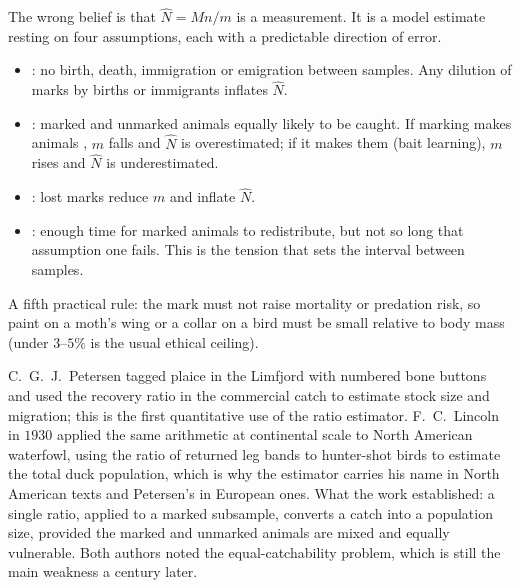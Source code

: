 \begin{warnbox}[title={TRAP: the four assumptions of mark-recapture}]
The wrong belief is that $\hat{N}=Mn/m$ is a measurement. It is a model estimate
resting on four assumptions, each with a predictable direction of error.
\begin{itemize}
\item {}: no birth, death, immigration or emigration between
samples. Any dilution of marks by births or immigrants inflates $\hat{N}$.
\item {}: marked and unmarked animals equally likely to be
caught. If marking makes animals , $m$ falls and $\hat{N}$ is
overestimated; if it makes them  (bait learning), $m$ rises and
$\hat{N}$ is underestimated.
\item {}: lost marks reduce $m$ and inflate
$\hat{N}$.
\item {}: enough time for marked animals to redistribute, but
not so long that assumption one fails. This is the tension that sets the
interval between samples.
\end{itemize}
A fifth practical rule: the mark must not raise mortality or predation risk, so
paint on a moth's wing or a collar on a bird must be small relative to body mass
(under $3$--$5\%$ is the usual ethical ceiling).
\end{warnbox}

\begin{expbox}[title={EXPERIMENT: Petersen's plaice, 1896, and Lincoln's ducks, 1930}]
C.~G.~J.~Petersen tagged plaice in the Limfjord with numbered bone buttons and
used the recovery ratio in the commercial catch to estimate stock size and
migration; this is the first quantitative use of the ratio estimator.
F.~C.~Lincoln in $1930$ applied the same arithmetic at continental scale to North
American waterfowl, using the ratio of returned leg bands to hunter-shot birds to
estimate the total duck population, which is why the estimator carries his name in
North American texts and Petersen's in European ones. What the work established:
a single ratio, applied to a marked subsample, converts a catch into a population
size, provided the marked and unmarked animals are mixed and equally vulnerable.
Both authors noted the equal-catchability problem, which is still the main
weakness a century later.
\end{expbox}

